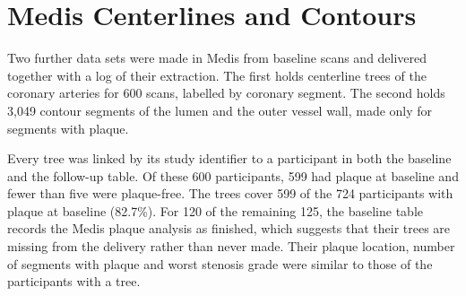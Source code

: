 \section{Medis Centerlines and Contours}
\label{sec:data-medis}

Two further data sets were made in Medis from baseline scans and delivered together with a log of their extraction.
The first holds centerline trees of the coronary arteries for 600 scans, labelled by coronary segment.
The second holds 3,049 contour segments of the lumen and the outer vessel wall, made only for segments with plaque.

Every tree was linked by its study identifier to a participant in both the baseline and the follow-up table.
Of these 600 participants, 599 had plaque at baseline and fewer than five were plaque-free.
The trees cover 599 of the 724 participants with plaque at baseline (82.7\%).
For 120 of the remaining 125, the baseline table records the Medis plaque analysis as finished, which suggests that their trees are missing from the delivery rather than never made.
Their plaque location, number of segments with plaque and worst stenosis grade were similar to those of the participants with a tree.
